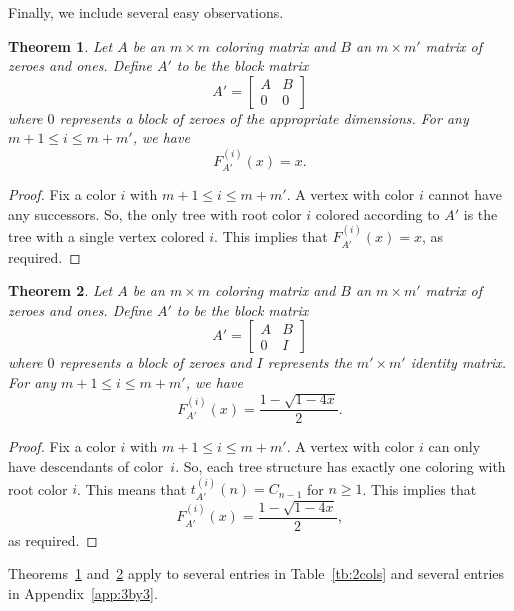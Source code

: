 \documentclass[12pt]{amsart}
\newtheorem{theorem}{Theorem}
\newcommand{\gff}[2]{F_{#2}^{(#1)}(x)}
\begin{document}
Finally, we include several easy observations.
\begin{theorem}\label{prop:zerorows}
    Let $A$ be an $m\times m$ coloring matrix and $B$ an $m\times m'$ matrix of zeroes and ones. Define $A'$ to be the block matrix
    \[
    A'=\left[\begin{array}{c|c}A&B\\\hline 0&0\end{array}\right]
    \]
    where $0$ represents a block of zeroes of the appropriate dimensions.
    For any $m+1\leq i\leq m+m'$, we have
    \[
    \gff{i}{A'}=x.
    \]
\end{theorem}
\begin{proof}
    Fix a color $i$ with
    $m+1\leq i\leq m+m'$. 
    A vertex with color $i$ cannot have any successors. So, the only tree with root color $i$ colored according to $A'$ is the tree with a single vertex colored $i$. This implies that $\gff{i}{A'}=x$, as required.
\end{proof}

\begin{theorem}\label{prop:catrows}
    Let $A$ be an $m\times m$ coloring matrix and $B$ an $m\times m'$ matrix of zeroes and ones. Define $A'$ to be the block matrix
    \[
    A'=\left[\begin{array}{c|c}A&B\\\hline 0&I\end{array}\right]
    \]
    where $0$ represents a block of zeroes and $I$ represents the $m'\times m'$ identity matrix.
    For any $m+1\leq i\leq m+m'$, we have
    \[
    \gff{i}{A'}=\frac{1-\sqrt{1-4x}}{2}.
    \]
\end{theorem}
\begin{proof}
    Fix a color $i$ with
    $m+1\leq i\leq m+m'$.
    A vertex with color $i$ can only have descendants of color~$i$. So, each tree structure has exactly one coloring with root color $i$. This means that $t_{A'}^{(i)}(n)=C_{n-1}$ for $n\geq1$.
    This implies that
    \[
    \gff{i}{A'}=\frac{1-\sqrt{1-4x}}{2},
    \]
    as required.
\end{proof}
Theorems~\ref{prop:zerorows} and~\ref{prop:catrows} apply to several entries in Table~\ref{tb:2cols} and several  entries in Appendix~\ref{app:3by3}.
\end{document}
